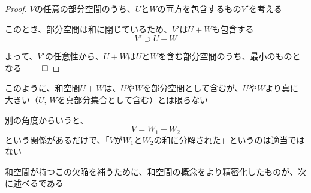 \documentclass[../../../topic_linear-algebra]{subfiles}
\begin{document}
\begin{proof}
  $V$の任意の部分空間のうち、$U$と$W$の両方を包含するもの$V'$を考える

  このとき、部分空間は和に閉じているため、$V'$は$U+W$も包含する
  \begin{equation*}
    V' \supset U + W
  \end{equation*}

  よって、$V'$の任意性から、$U + W$は$U$と$W$を含む部分空間のうち、最小のものとなる $\qed$
\end{proof}

\sectionline

このように、和空間$U+W$は、$U$や$W$を部分空間として含むが、$U$や$W$より真に大きい（$U,\,W$を真部分集合として含む）とは限らない

\br

別の角度からいうと、
\begin{equation*}
  V = W_1 + W_2
\end{equation*}
という関係があるだけで、「$V$が$W_1$と$W_2$の和に分解された」というのは適当ではない

\br

和空間が持つこの欠陥を補うために、和空間の概念をより精密化したものが、次に述べるである
\end{document}

